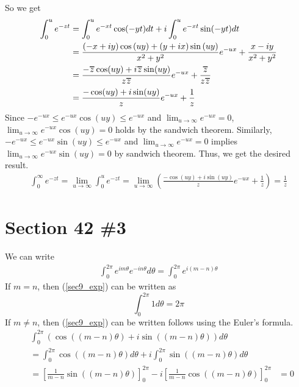\documentclass{scrartcl}
\newcommand\Overline[2][0.8pt]{%
  \begin{tikzpicture}[baseline=(a.base)]
    \node[inner xsep=0pt,inner ysep=1.5pt] (a) {$#2$};
    \draw[line width= #1] (a.north west) -- (a.north east);
  \end{tikzpicture}
}
\begin{document}
So we get
\begin{align*}
  \int^u_0 e^{-zt} &= \int^u_0 e^{-xt} \cos(-yt) dt + i \int^u_0 e^{-xt} \sin(-yt) dt \\
                   &= \frac{(-x + iy) \cos\left(u y\right) + (y + ix) \sin\left(u y\right)}{x^{2} + y^{2}}e^{-ux} + \frac{x - iy}{x^2 + y^2} \\
                   &= \frac{-\Overline{z} \cos(uy) + i\Overline{z} \sin(uy)}{z\Overline{z}} e^{-ux} + \frac{\Overline{z}}{z\Overline{z}} \\
                   &= \frac{-\cos(uy) + i\sin(uy)}{z} e^{-ux} + \frac{1}{z}
\end{align*}
Since \(-e^{-ux} \leq e^{-ux} \cos (uy) \leq e^{-ux}\) and \(\lim_{u \to \infty} e^{-ux} = 0\), \(\lim_{u \to \infty} e^{-ux} \cos (uy) = 0\) holds by the sandwich theorem.
Similarly, \(-e^{-ux} \leq e^{-ux} \sin (uy) \leq e^{-ux}\) and \(\lim_{u \to \infty} e^{-ux} = 0\) implies \(\lim_{u \to \infty} e^{-ux} \sin (uy) = 0\) by sandwich theorem.
Thus, we get the desired result.
\begin{align*}
  \int^\infty_0 e^{-zt} = \lim_{u \to \infty} \int^u_0 e^{-zt} = \lim_{u \to \infty} \left( \frac{-\cos(uy) + i\sin(uy)}{z} e^{-ux} + \frac{1}{z} \right) = \frac{1}{z}
\end{align*}

\section{Section 42 \#3}
We can write
\begin{align}\label{sec9_exp}
  \int^{2\pi}_0 e^{im\theta} e^{-in\theta} d\theta = \int^{2\pi}_0 e^{i(m - n)\theta}
\end{align}
If \(m = n\), then (\ref{sec9_exp}) can be written as
\[
  \int^{2\pi}_0 1 d\theta = 2\pi
\]
If \(m \not = n\), then (\ref{sec9_exp}) can be written follows using the Euler's formula.
\begin{align*}
  &\int^{2\pi}_0 (\cos ((m - n)\theta) + i \sin ((m - n)\theta)) d\theta \\
  &= \int^{2\pi}_0 \cos ((m - n)\theta) d\theta + i \int^{2\pi}_0 \sin ((m - n)\theta) d\theta \\
  &= \left[ \frac{1}{m - n} \sin ((m - n)\theta) \right]^{2\pi}_0 - i \left[ \frac{1}{m - n} \cos ((m - n)\theta) \right]^{2\pi}_0
  &= 0
\end{align*}
\end{document}
